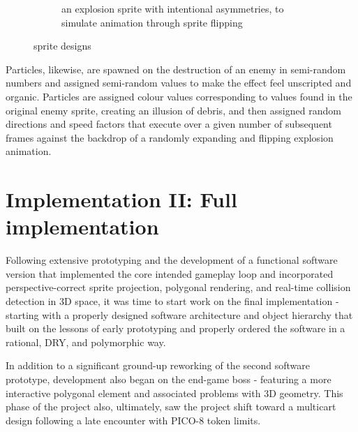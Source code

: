 \documentclass[11pt]{article}
\begin{document}
\begin{figure}[h]
\begin{subfigure}{.45\textwidth}
  \caption{an explosion sprite with intentional asymmetries, to simulate animation through sprite flipping}
  \label{fig:explosion_sprite}
\end{subfigure}\hfill
\caption{sprite designs}
\label{fig:sprites}
\end{figure}

Particles, likewise, are spawned on the destruction of an enemy in semi-random numbers and assigned semi-random
values to make the effect feel unscripted and organic. Particles are assigned colour values corresponding to
values found in the original enemy sprite, creating an illusion of debris, and then assigned random directions
and speed factors that execute over a given number of subsequent frames against the backdrop of a randomly
expanding and flipping explosion animation.


\section{Implementation II: Full implementation}

Following extensive prototyping and the development of a functional software version that
implemented the core intended gameplay loop and incorporated perspective-correct sprite projection,
polygonal rendering, and real-time collision detection in 3D space, it was time to start work on
the final implementation - starting with a properly designed software architecture and object
hierarchy that built on the lessons of early prototyping and properly ordered the software in
a rational, DRY, and polymorphic way.

In addition to a significant ground-up reworking of the second software prototype, development
also began on the end-game boss - featuring a more interactive polygonal element and associated
problems with 3D geometry. This phase of the project also, ultimately, saw the project shift toward
a multicart design following a late encounter with PICO-8 token limits.
\end{document}
